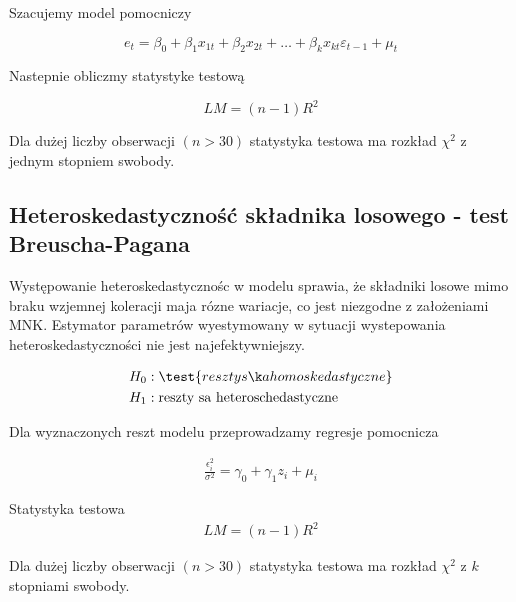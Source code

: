 Szacujemy model pomocniczy

\begin{equation}
    e_{t} = \beta_{0} + \beta_{1}x_{1t} + \beta_{2}x_{2t} + \dots + \beta_{k}x_{kt}\varepsilon_{t-1} + \mu_{t}
\end{equation}

Nastepnie obliczmy statystyke testową

\begin{equation}
    LM = (n-1)R^2
\end{equation}

Dla dużej liczby obserwacji \((n > 30)\) statystyka testowa ma rozkład \(\chi^2\) z jednym stopniem swobody.

\subsection{Heteroskedastyczność składnika losowego - test Breuscha-Pagana}\label{subsec:heteroskedastyczność-składnika-losowego}

Występowanie heteroskedastycznośc w modelu sprawia, że składniki losowe mimo braku wzjemnej koleracji maja rózne wariacje, co jest niezgodne z założeniami MNK.
Estymator parametrów wyestymowany w sytuacji wystepowania heteroskedastyczności nie jest najefektywniejszy.


\begin{equation}
    \begin{split}
        &H_0: \test{reszty są homoskedastyczne}\\
        &H_1: \text{reszty sa heteroschedastyczne}
    \end{split}
\end{equation}

Dla wyznaczonych reszt modelu przeprowadzamy regresje pomocnicza

\begin{equation}
    \begin{split}
        \frac{\epsilon_{i}^{2}}{\sigma^2} = \gamma_{0} + \gamma_{1}z_{i} + \mu_{i}
    \end{split}
\end{equation}

Statystyka testowa
\begin{equation}
    \begin{split}
        LM = (n-1)R^{2}
    \end{split}
\end{equation}

Dla dużej liczby obserwacji \((n > 30)\) statystyka testowa ma rozkład \(\chi^{2}\) z \(k\) stopniami swobody.
